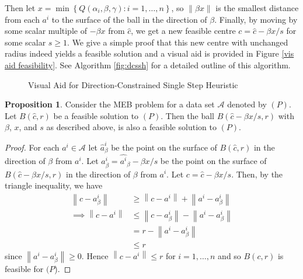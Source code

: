 \documentclass[11pt,twoside]{report}
\newcommand{\A}{\mathcal{A}} %
\newcommand{\norm}[1]{\left\lVert#1\right\rVert} %
\theoremstyle{definition}
\newtheorem{proposition}{Proposition}
\numberwithin{theorem}{section}
\numberwithin{definition}{section}
\numberwithin{lemma}{section}
\numberwithin{proposition}{section}
\numberwithin{equation}{section}
\numberwithin{figure}{section}
\begin{document}
Then let $x=\min\left\{Q(\alpha_i, \beta, \gamma):i=1,\ldots,n\right\}$, so $\norm{\beta x}$ is the smallest distance from each $a^i$ to the surface of the ball in the direction of $\beta$. Finally, by moving by some scalar multiple of $-\beta x$ from $\hat{c}$, we get a new feasible centre $c=\hat{c}-\beta x/s$ for some scalar $s\geq1$. We give a simple proof that this new centre with unchanged radius indeed yields a feasible solution and a visual aid is provided in Figure \ref{vis aid feasibility}. See Algorithm \ref{fig:dcssh} for a detailed outline of this algorithm.

\begin{figure}
    \centering
    \caption{Visual Aid for Direction-Constrained Single Step Heuristic}
    \label{vis aid derivation}
\end{figure}

\begin{proposition}\label{imp heuristic feasibility}
Consider the MEB problem for a data set $\A$ denoted by $(P)$. Let $B(\hat{c},r)$ be a feasible solution to $(P)$. Then the ball $B(\hat{c}-\beta x/s, r)$ with $\beta$, $x$, and $s$ as described above, is also a feasible solution to $(P)$.
\end{proposition}
\begin{proof}
For each $a^i\in\A$ let $\hat{a}^i_\beta$ be the point on the surface of $B(\hat{c},r)$ in the direction of $\beta$ from $a^i$. Let $a^i_\beta=\hat{a^i}_\beta - \beta x/s$ be the point on the surface of $B(\hat{c}-\beta x/s, r)$ in the direction of $\beta$ from $a^i$. Let $c=\hat{c}-\beta x/s$. Then, by the triangle inequality, we have
\begin{align*}
    \norm{c-a^i_\beta} &\geq \norm{c-a^i} + \norm{a^i-a^i_\beta} \\
    \implies \norm{c-a^i} &\leq \norm{c-a^i_\beta} - \norm{a^i-a^i_\beta} \\
    &= r-\norm{a^i-a^i_\beta} \\
    &\leq r
\end{align*}
since $\norm{a^i-a^i_\beta}\geq0$. Hence $\norm{c-a^i}\leq r$ for $i=1,\ldots,n$ and so $B(c, r)$ is feasible for $(P$).
\end{proof}
\end{document}
